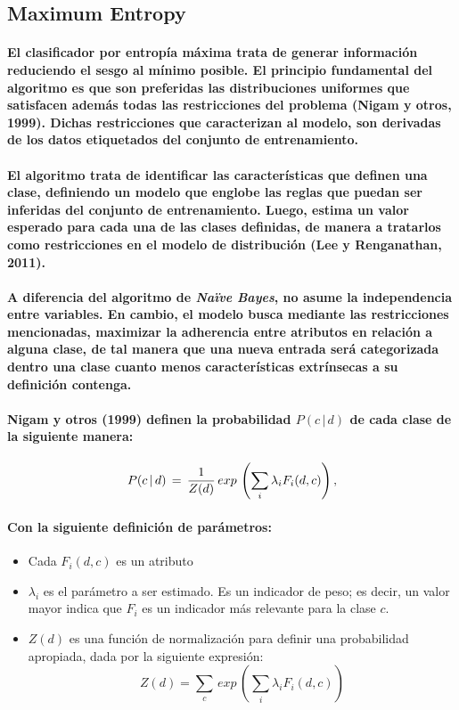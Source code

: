 \subsection{Maximum Entropy}
\paragraph{El clasificador por entrop\'ia m\'axima trata de generar informaci\'on reduciendo el sesgo al m\'inimo posible. El principio fundamental del algoritmo es que son preferidas las distribuciones uniformes que satisfacen adem\'as todas las restricciones del problema (Nigam y otros, 1999). Dichas restricciones que caracterizan al modelo, son derivadas de los datos etiquetados del conjunto de entrenamiento.}
\paragraph{El algoritmo trata de identificar las caracter\'isticas que definen una clase, definiendo un modelo que englobe las reglas que puedan ser inferidas del conjunto de entrenamiento. Luego, estima un valor esperado para cada una de las clases definidas, de manera a tratarlos como restricciones en el modelo de distribuci\'on (Lee y Renganathan, 2011).}
\paragraph{A diferencia del algoritmo de \textit{Na\"ive Bayes}, no asume la independencia entre variables. En cambio, el modelo busca mediante las restricciones mencionadas, maximizar la adherencia entre atributos en relaci\'on a alguna clase, de tal manera que una nueva entrada ser\'a categorizada dentro una clase cuanto menos caracter\'isticas extr\'insecas a su definici\'on contenga.}
\paragraph{Nigam y otros (1999) definen la probabilidad $P(c \, | \, d)$ de cada clase de la siguiente manera:}
$$ P(c \, | \, d) \, = \, {1 \over Z(d)} \, exp \, 
\left(
\sum_{i} \lambda_{i}F_{i}(d,c)
\right) ,$$
\paragraph{Con la siguiente definici\'on de par\'ametros:}
\begin{itemize}
\item Cada $F_{i}(d,c)$ es un atributo
\item $\lambda_{i}$ es el par\'ametro a ser estimado. Es un indicador de peso; es decir, un valor mayor indica que $F_{i}$ es un indicador m\'as relevante para la clase $c$.
\item $Z(d)$ es una funci\'on de normalizaci\'on para definir una probabilidad apropiada, dada por la siguiente expresi\'on:
$$
Z(d) = \sum_{c} \, exp \, \left( \sum_{i} \lambda_{i}F_{i}(d,c)  \right)
$$
\end{itemize}

